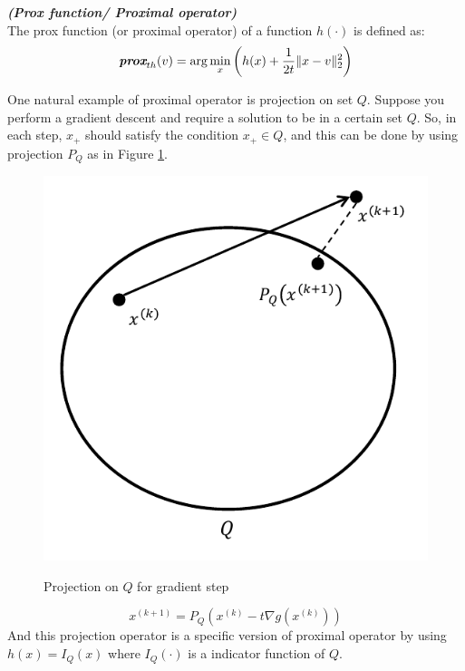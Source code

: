 \documentclass[12pt]{report}
\begin{document}
\begin{definition}\textbf{\em{(Prox function/ Proximal operator)}}\\
The prox function (or proximal operator) of a function $h(\cdot)$ is defined as:
\begin{equation}
\textbf{\em{prox}}_{th}(v) = \arg\min_{x} \left( h(x)+\frac{1}{2t}\|x-v\|_2^2 \right)
\end{equation}
\end{definition}

One natural example of proximal operator is projection on set $Q$. Suppose you perform a gradient descent and require a solution to be in a certain set $Q$. So, in each step, $x_{+}$ should satisfy the condition $x_{+}\in Q$, and this can be done by using projection $P_Q$ as in Figure \ref{16fig:projection}.
\begin{figure}[t]
    \centering
    \includegraphics[scale=0.8]{L16_fig_projection}\\
    \caption{Projection on $Q$ for gradient step}\label{16fig:projection}
\end{figure}
\begin{equation}
x^{(k+1)} = P_Q \left( x^{(k)}-t \nabla g(x^{(k)})\right)
\end{equation}
And this projection operator is a specific version of proximal operator by using $h(x)=I_Q (x)$ where $I_Q(\cdot )$ is a indicator function of $Q$.
\end{document}
